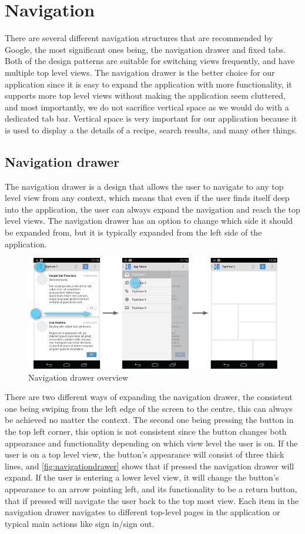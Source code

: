 \section{Navigation}\label{sec:navigation}
There are several different navigation structures that are recommended by Google, the most significant ones being, the navigation drawer and fixed tabs. Both of the design patterns are suitable for switching views frequently, and have multiple top level views. 
The navigation drawer is the better choice for our application since it is easy to expand the application with more functionality, it supports more top level views without making the application seem cluttered, and most importantly, we do not sacrifice vertical space as we would do with a dedicated tab bar. Vertical space is very important for our application because it is used to display a the details of a recipe, search results, and many other things.

\subsection{Navigation drawer}
The navigation drawer is a design that allows the user to navigate to any top level view from any context, which means that even if the user finds itself deep into the application, the user can always expand the navigation and reach the top level views. 
The navigation drawer has an option to change which side it should be expanded from, but it is typically expanded from the left side of the application.
\begin{figure}[H]
\centering
\includegraphics[width=0.9\linewidth]{img/screenshots/navigation_drawer_overview.png}
\caption{Navigation drawer overview \cite{guidelines-navigationdrawer}}
\label{fig:navigationdrawer}
\end{figure}
There are two different ways of expanding the navigation drawer, the consistent one being swiping from the left edge of the screen to the centre, this can always be achieved no matter the context. 
The second one being pressing the button in the top left corner, this option is not consistent since the button changes both appearance and functionality depending on which view level the user is on. 
If the user is on a top level view, the button's appearance will consist of three thick lines, and \autoref{fig:navigationdrawer} shows that if pressed the navigation drawer will expand.
If the user is entering a lower level view, it will change the button's appearance to an arrow pointing left, and its functionality to be a return button, that if pressed will navigate the user back to the top most view. 
Each item in the navigation drawer navigates to different top-level pages in the application or typical main actions like sign in/sign out.

